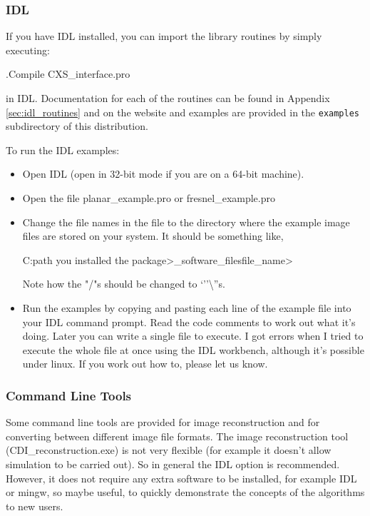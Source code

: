 \documentclass[]{cxs-software}
\begin{document}
\subsubsection{IDL}
If you have IDL installed, you can import the library routines by
simply executing:
\begin{myverbatim}
   .Compile CXS_interface.pro
\end{myverbatim}
in IDL. Documentation for each of the routines can be found in
Appendix \ref{sec:idl_routines} and on the website and examples are
provided in the {\tt examples} subdirectory of this distribution.

To run the IDL examples:
\begin{itemize}
\item Open IDL (open in 32-bit mode if you are on a 64-bit machine).
\item Open the file planar\_example.pro or fresnel\_example.pro
\item Change the file names in the file to the directory where the
  example image files are stored on your system. It should be
  something like,
  \begin{myverbatim}
    C:\<path you installed the package>\cxs_software\examples\image_files\<file_name>
  \end{myverbatim}
     Note how the "/"s should be changed to `''\textbackslash''s.
   \item Run the examples by copying and pasting each line of the
     example file into your IDL command prompt. Read the code comments
     to work out what it's doing. Later you can write a single file to
     execute. I got errors when I tried to execute the whole file at
     once using the IDL workbench, although it's possible under
     linux. If you work out how to, please let us know.
\end{itemize}


\subsubsection{Command Line Tools}

Some command line tools are provided for image reconstruction and for
converting between different image file formats. The image
reconstruction tool (CDI\_reconstruction.exe) is not very flexible
(for example it doesn't allow simulation to be carried out). So in
general the IDL option is recommended.  However, it does not require
any extra software to be installed, for example IDL or mingw, so maybe
useful, to quickly demonstrate the concepts of the algorithms to new
users.
\end{document}

